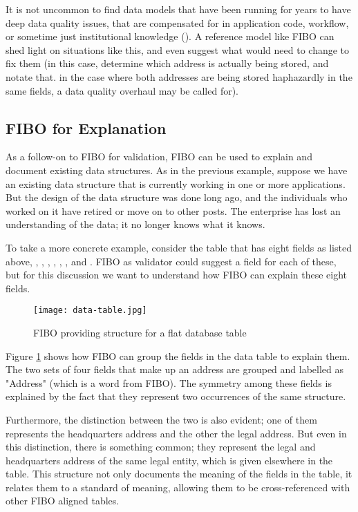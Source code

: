 It is not uncommon to find data models that have been running  for years to have deep data quality issues, that are compensated for in application code, workflow, or sometime just institutional knowledge ().  A reference model like FIBO can shed light on situations like this, and even suggest what would need to change to fix them (in this case, determine which address is actually being stored, and notate that.  in the case where both addresses are being stored haphazardly in the same fields, a data quality overhaul may be called for). 

\subsection{FIBO for Explanation}

As a follow-on to FIBO for validation, FIBO can be used to explain and document existing data structures.  As in the previous example, suppose we have an existing data structure that is currently working in one or more applications.  But the design of the data structure was done long ago, and the individuals who worked on it have retired or move on to other posts.  The enterprise has lost an understanding of the data; it no longer knows what it knows. 

To take a more concrete example, consider the table that has eight fields as listed above, , , , , , ,  and .  FIBO as validator could suggest a  field for each of these, but for this discussion we want to understand how FIBO can explain these eight fields.  

\begin{figure}[hbt] %
\centering
  \texttt{[image: data-table.jpg]}
\caption{FIBO providing structure for a flat database table }
\label{ch01.fig2} 
\end{figure}


Figure \ref{ch01.fig2} shows how FIBO can group the fields in the data table to explain them.  The two sets of four fields that make up an address are grouped and labelled as "Address" (which is a word from FIBO).  The symmetry among these fields is explained by the fact that they represent two occurrences of the same structure. 

Furthermore, the distinction between the two is also evident; one of them represents the headquarters address and the other the legal address.  But even in this distinction, there is something common; they represent the legal and headquarters address of the same legal entity, which is given elsewhere in the table.  This structure not only documents the meaning of the fields in the table, it relates them to a standard of meaning, allowing them to be cross-referenced with other FIBO aligned tables. 

